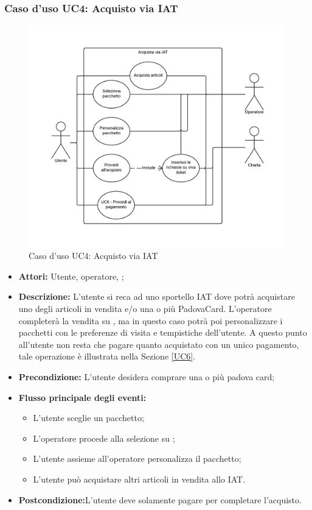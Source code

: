 \subsubsection{Caso d'uso UC4: Acquisto via IAT}\label{UC4}
\begin{figure}[H]
\centering
\includegraphics[width=1\textwidth]{images/UC4.png}
\caption{Caso d'uso UC4: Acquisto via IAT}
\end{figure}
\begin{itemize}
\item \textbf{Attori:} Utente, operatore, \charta;
\item \textbf{Descrizione:} L'utente si reca ad uno sportello IAT dove potrà acquistare uno degli articoli in vendita e/o una o più PadovaCard. L'operatore completerà la vendita su \tlite, ma in questo caso potrà poi personalizzare i pacchetti con le preferenze di visita e tempistiche dell'utente. A questo punto all'utente non resta che pagare quanto acquistato con un unico pagamento, tale operazione è illustrata nella Sezione \ref{UC6}.
\item \textbf{Precondizione:} L'utente desidera comprare una o più padova card;
\item \textbf{Flusso principale degli eventi:}
	\begin{itemize}
    	\item L'utente sceglie un pacchetto;
        \item L'operatore procede alla selezione su \tlite;
		\item L'utente assieme all'operatore personalizza il pacchetto;
		\item L'utente può acquistare altri articoli in vendita allo IAT.
	\end{itemize}
\item \textbf{Postcondizione:}L'utente deve solamente pagare per completare l'acquisto.
\end{itemize}

